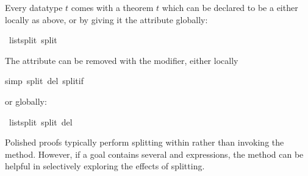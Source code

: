 \begin{isabellebody}
\begin{isamarkuptext}
Every datatype $t$ comes with a theorem
$t$ which can be declared to be a  either
locally as above, or by giving it the  attribute globally:%
\end{isamarkuptext}%
\isamarkuptrue%
\ list{\isachardot}split\ {\isacharbrackleft}split{\isacharbrackright}\isamarkupfalse%
%
\begin{isamarkuptext}%
\noindent
The  attribute can be removed with the  modifier,
either locally%
\end{isamarkuptext}%
\isamarkuptrue%
\isamarkupfalse%
simp\ split\ del{\isacharcolon}\ split{\isacharunderscore}if{\isacharparenright}\isamarkupfalse%
\isamarkupfalse%
%
\begin{isamarkuptext}%
\noindent
or globally:%
\end{isamarkuptext}%
\isamarkuptrue%
\ list{\isachardot}split\ {\isacharbrackleft}split\ del{\isacharbrackright}\isamarkupfalse%
%
\begin{isamarkuptext}%
Polished proofs typically perform splitting within  rather than 
invoking the  method.  However, if a goal contains
several  and  expressions, 
the  method can be
helpful in selectively exploring the effects of splitting.


\end{isamarkuptext}
\end{isabellebody}
